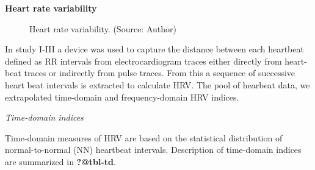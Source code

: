 \documentclass[
  a4paper,
  headsepline=true,
  open=any]{scrbook}
\begin{document}
\textbf{Heart rate variability}

\begin{figure}

\begin{minipage}[t]{\linewidth}

{\centering 


\caption{Heart rate variability. (Source: Author)}

}

\end{minipage}%

\end{figure}

In study I-III a device was used to capture the distance between each
heartbeat defined as RR intervals from electrocardiogram traces either
directly from heart-beat traces or indirectly from pulse traces. From
this a sequence of successive heart beat intervals is extracted to
calculate HRV. The pool of hearbeat data, we extrapolated time-domain
and frequency-domain HRV indices.

\emph{Time-domain indices}

Time-domain measures of HRV are based on the statistical distribution of
normal-to-normal (NN) heartbeat intervals. Description of time-domain
indices are summarized in \textbf{?@tbl-td}.
\end{document}
